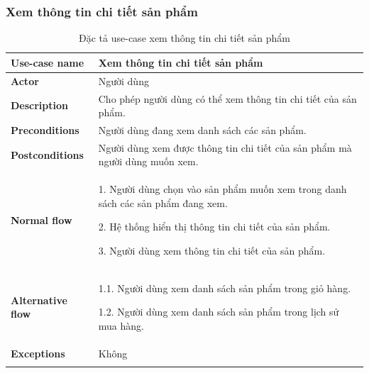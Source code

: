 \subsubsection{Xem thông tin chi tiết sản phẩm }
{
    \setlength\extrarowheight{6pt}
    \begin{longtable}{| p{} | p{} |}
        \hline
        \textbf{Use-case name}
         &
        Xem thông tin chi tiết sản phẩm
        \\
        \hline
        \textbf{Actor}
         &
        Người dùng
        \\
        \hline
        \textbf{Description}
         &
        Cho phép người dùng có thể xem thông tin chi tiết của sản phẩm.
        \\
        \hline
        \textbf{Preconditions}
         &
        Người dùng đang xem danh sách các sản phẩm.
        \\
        \hline
        \textbf{Postconditions}
         &
        Người dùng xem được thông tin chi tiết của sản phẩm mà người dùng muốn xem.
        \\
        \hline
        \begin{flushleft}
            \textbf{Normal flow}
        \end{flushleft}
         &
        1. Người dùng chọn vào sản phẩm muốn xem trong danh sách các sản phẩm đang xem.

        2. Hệ thống hiển thị thông tin chi tiết của sản phẩm.

        3. Người dùng xem thông tin chi tiết của sản phẩm.
        \\
        \hline
        \textbf{Alternative flow}
         &
        1.1. Người dùng xem danh sách sản phẩm trong giỏ hàng.

        1.2. Người dùng xem danh sách sản phẩm trong lịch sử mua hàng.
        \\
        \hline
        \textbf{Exceptions}
         &
        Không
        \\
        \hline
        \caption{Đặc tả use-case xem thông tin chi tiết sản phẩm}
    \end{longtable}
}



